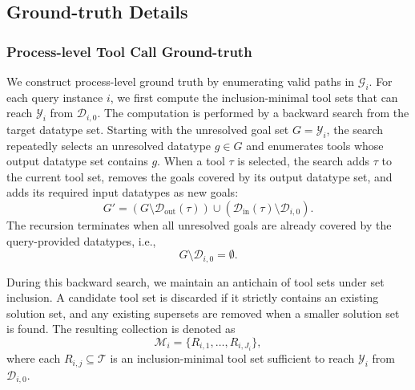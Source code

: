 \documentclass{llmxive}
\begin{document}
\subsection{Ground-truth Details}
\label{app:groundtruth-details}

\subsubsection{Process-level Tool Call Ground-truth}
\label{app:process-level-groundtruth}

We construct process-level ground truth by enumerating valid paths in $\mathcal{G}_i$. 
For each query instance $i$, we first compute the inclusion-minimal tool sets that can reach 
$\mathcal{Y}_i$ from $\mathcal{D}_{i,0}$.
The computation is performed by a backward search from the target datatype set. 
Starting with the unresolved goal set $G=\mathcal{Y}_i$, the search repeatedly selects an unresolved datatype $g \in G$ and enumerates tools whose output datatype set contains $g$.
When a tool $\tau$ is selected, the search adds $\tau$ to the current tool set, removes the goals covered by its output datatype set, and adds its required input datatypes as new goals:
\begin{equation}
G' = 
(G \setminus \mathcal{D}_{\mathrm{out}}(\tau)) 
\cup 
(\mathcal{D}_{\mathrm{in}}(\tau) \setminus \mathcal{D}_{i,0}).
\end{equation}
The recursion terminates when all unresolved goals are already covered by the query-provided datatypes, i.e.,
\begin{equation}
G \setminus \mathcal{D}_{i,0} = \emptyset.
\end{equation}

During this backward search, we maintain an antichain of tool sets under set inclusion. 
A candidate tool set is discarded if it strictly contains an existing solution set, and any existing supersets are removed when a smaller solution set is found. 
The resulting collection is denoted as
\begin{equation}
\mathcal{M}_i = \{R_{i,1},\ldots,R_{i,J_i}\},
\end{equation}
where each $R_{i,j} \subseteq \mathcal{T}$ is an inclusion-minimal tool set sufficient to reach $\mathcal{Y}_i$ from $\mathcal{D}_{i,0}$.
\end{document}
